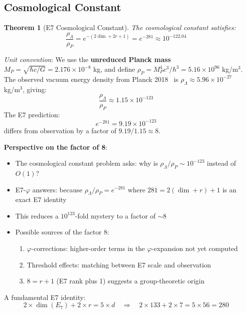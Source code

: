 \documentclass[11pt,a4paper]{article}
\newtheorem{theorem}{Theorem}
\begin{document}
\subsection{Cosmological Constant}

\begin{theorem}[E7 Cosmological Constant]
The cosmological constant satisfies:
\begin{equation}
\boxed{\frac{\rho_\Lambda}{\rho_P} = e^{-(2\dim + 2r + 1)} = e^{-281} \approx 10^{-122.04}}
\end{equation}
\end{theorem}

\textit{Unit convention}: We use the \textbf{unreduced Planck mass} $M_P = \sqrt{\hbar c / G} = 2.176 \times 10^{-8}$ kg, and define $\rho_P = M_P^4 c^3 / \hbar^3 = 5.16 \times 10^{96}$ kg/m$^3$. The observed vacuum energy density from Planck 2018~\cite{Planck2018} is $\rho_\Lambda \approx 5.96 \times 10^{-27}$ kg/m$^3$, giving:
\begin{equation}
\frac{\rho_\Lambda}{\rho_P} \approx 1.15 \times 10^{-123}
\end{equation}
The E7 prediction:
\begin{equation}
e^{-281} = 9.19 \times 10^{-123}
\end{equation}
differs from observation by a factor of $9.19/1.15 \approx 8$.

\textbf{Perspective on the factor of 8}:
\begin{itemize}
\item The cosmological constant problem asks: why is $\rho_\Lambda/\rho_P \sim 10^{-123}$ instead of $O(1)$?
\item E7-$\varphi$ answers: because $\rho_\Lambda/\rho_P = e^{-281}$ where $281 = 2(\dim + r) + 1$ is an exact E7 identity
\item This reduces a $10^{123}$-fold mystery to a factor of $\sim 8$
\item Possible sources of the factor 8:
  \begin{enumerate}
  \item $\varphi$-corrections: higher-order terms in the $\varphi$-expansion not yet computed
  \item Threshold effects: matching between E7 scale and observation
  \item $8 = r + 1$ (E7 rank plus 1) suggests a group-theoretic origin
  \end{enumerate}
\end{itemize}

A fundamental E7 identity:
\begin{equation}
2 \times \dim(E_7) + 2 \times r = 5 \times d \quad \Rightarrow \quad 2 \times 133 + 2 \times 7 = 5 \times 56 = 280
\end{equation}
\end{document}
